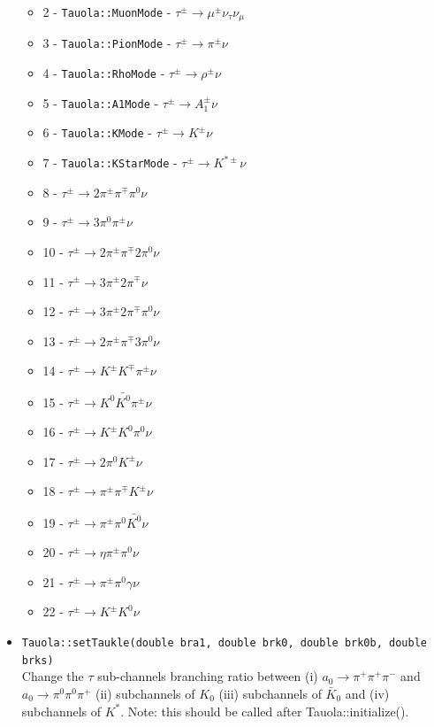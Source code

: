 \documentclass[]{Tauola_interface_design}
\begin{document}
\begin{itemize}
\begin{itemize}
        \item 2 - {\tt Tauola::MuonMode} - $\tau^{\pm} \rightarrow \mu^{\pm} \nu_{\tau} \nu_{\mu}$
        \item 3 - {\tt Tauola::PionMode} - $\tau^{\pm} \rightarrow \pi^{\pm} \nu$
        \item 4 - {\tt Tauola::RhoMode} - $\tau^{\pm} \rightarrow \rho^{\pm} \nu$
        \item 5 - {\tt Tauola::A1Mode} - $\tau^{\pm} \rightarrow A_1^{\pm} \nu$
        \item 6 - {\tt Tauola::KMode} - $\tau^{\pm} \rightarrow K^{\pm} \nu$
        \item 7 - {\tt Tauola::KStarMode} - $\tau^{\pm} \rightarrow K^{*\pm} \nu$
        \item 8 - $\tau^{\pm} \rightarrow 2 \pi^{\pm}\pi^{\mp}\pi^0 \nu$
        \item 9 - $\tau^{\pm} \rightarrow 3 \pi^0 \pi^{\pm} \nu$
        \item 10 - $\tau^{\pm} \rightarrow 2 \pi^{\pm}\pi^{\mp}2\pi^0 \nu$
        \item 11 - $\tau^{\pm} \rightarrow 3 \pi^{\pm} 2\pi^{\mp}  \nu$
        \item 12 - $\tau^{\pm} \rightarrow 3 \pi^{\pm} 2\pi^{\mp}\pi^0 \nu$
        \item 13 - $\tau^{\pm} \rightarrow 2 \pi^{\pm}\pi^{\mp}3\pi^0 \nu$
        \item 14 - $\tau^{\pm} \rightarrow K^{\pm} K^{\mp} \pi^{\pm} \nu$
        \item 15 - $\tau^{\pm} \rightarrow K^0 \bar{K^0}\pi^{\pm} \nu$
        \item 16 - $\tau^{\pm} \rightarrow K^{\pm}K^0\pi^0 \nu$
        \item 17 - $\tau^{\pm} \rightarrow 2\pi^0K^{\pm} \nu$
        \item 18 - $\tau^{\pm} \rightarrow \pi^{\pm}\pi^{\mp} K^{\pm} \nu$
        \item 19 - $\tau^{\pm} \rightarrow \pi^{\pm}\pi^0 \bar{K^0} \nu$
        \item 20 - $\tau^{\pm} \rightarrow \eta \pi^{\pm} \pi^0 \nu$
        \item 21 - $\tau^{\pm} \rightarrow \pi^{\pm}\pi^0 \gamma \nu$
        \item 22 - $\tau^{\pm} \rightarrow K^{\pm}K^0 \nu$
      \end{itemize}
 \item {\tt Tauola::setTaukle(double  bra1, double brk0, double brk0b, double brks)} \hfill \\
Change  the $\tau$ sub-channels branching ratio between (i) $a_0 \to \pi^+\pi^+\pi^-$ and $a_0 \to \pi^0\pi^0\pi^+$
(ii) subchannels of $K_0$ (iii)  subchannels of $\bar K_0$ and (iv) subchannels of $ K^*$.
Note: this should be called after Tauola::initialize().


\end{itemize}
\end{document}
